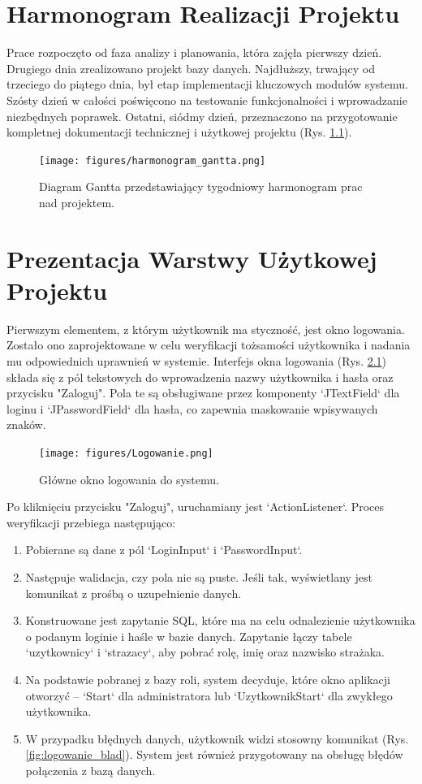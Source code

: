 \chapter{Harmonogram Realizacji Projektu}
\label{chap:harmonogram}
Prace rozpoczęto od faza analizy i planowania, która zajęła pierwszy dzień. Drugiego dnia zrealizowano projekt bazy danych. Najdłuższy, trwający od trzeciego do piątego dnia, był etap implementacji kluczowych modułów systemu. Szósty dzień w całości poświęcono na testowanie funkcjonalności i wprowadzanie niezbędnych poprawek. Ostatni, siódmy dzień, przeznaczono na przygotowanie kompletnej dokumentacji technicznej i użytkowej projektu (Rys. \ref{fig:harmonogram_gantta}).

\begin{figure}[H]
    \centering
    \texttt{[image: figures/harmonogram\_gantta.png]}
    \caption{Diagram Gantta przedstawiający tygodniowy harmonogram prac nad projektem.}
    \label{fig:harmonogram_gantta}
\end{figure}

\chapter{Prezentacja Warstwy Użytkowej Projektu}
\label{sec:logowanie}

Pierwszym elementem, z którym użytkownik ma styczność, jest okno logowania. Zostało ono zaprojektowane w celu weryfikacji tożsamości użytkownika i nadania mu odpowiednich uprawnień w systemie. Interfejs okna logowania (Rys. \ref{fig:logowanie}) składa się z pól tekstowych do wprowadzenia nazwy użytkownika i hasła oraz przycisku "Zaloguj". Pola te są obsługiwane przez komponenty `JTextField` dla loginu i `JPasswordField` dla hasła, co zapewnia maskowanie wpisywanych znaków.

\begin{figure}[H]
	\centering
	\texttt{[image: figures/Logowanie.png]}
	\caption{Główne okno logowania do systemu.}
	\label{fig:logowanie}
\end{figure}

Po kliknięciu przycisku "Zaloguj", uruchamiany jest `ActionListener`. Proces weryfikacji przebiega następująco:
\begin{enumerate}
	\item Pobierane są dane z pól `LoginInput` i `PasswordInput`.
	\item Następuje walidacja, czy pola nie są puste. Jeśli tak, wyświetlany jest komunikat z prośbą o uzupełnienie danych.
	\item Konstruowane jest zapytanie SQL, które ma na celu odnalezienie użytkownika o podanym loginie i haśle w bazie danych. Zapytanie łączy tabele `uzytkownicy` i `strazacy`, aby pobrać rolę, imię oraz nazwisko strażaka.
	\item Na podstawie pobranej z bazy roli, system decyduje, które okno aplikacji otworzyć – `Start` dla administratora lub `UzytkownikStart` dla zwykłego użytkownika.
	\item W przypadku błędnych danych, użytkownik widzi stosowny komunikat (Rys. \ref{fig:logowanie_blad}). System jest również przygotowany na obsługę błędów połączenia z bazą danych.
\end{enumerate}

